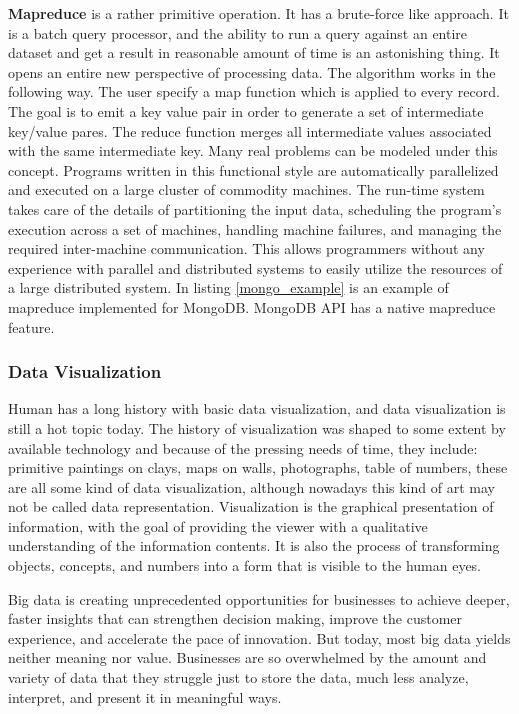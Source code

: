 \textbf{Mapreduce} is a rather primitive operation. It has a brute-force like approach. It is a batch query processor, and the ability to run a query against an entire dataset and get a result in reasonable amount of time is an astonishing thing. It opens an entire new perspective of processing data. The algorithm works in the following way. The user specify a map function which is applied to every record. The goal is to emit a key value pair in order to generate a set of intermediate key/value pares. The reduce function merges all intermediate values associated with the same intermediate key. Many real problems can be modeled under this concept. Programs written in this functional style are automatically parallelized and executed on a large cluster of commodity machines. The run-time system takes care of the details of partitioning the input data, scheduling the program's execution across a set of machines, handling machine failures, and managing the required inter-machine communication. This allows programmers without any experience with parallel and distributed systems to easily utilize the resources of a large distributed system. In listing \mbox{\ref{mongo_example}} is an example of mapreduce implemented for MongoDB. MongoDB API has a native mapreduce feature.



\subsubsection{Data Visualization}
Human has a long history with basic data visualization, and data visualization is still a hot topic today. The history of visualization was shaped to some extent by available technology and because of the pressing needs of time, they include: primitive paintings on clays, maps on walls, photographs, table of numbers, these are all some kind of data visualization, although nowadays this kind of art may not be called data representation. Visualization is the graphical presentation of information, with the goal of providing the viewer with a qualitative understanding of the information contents. It is also the process of transforming objects, concepts, and numbers into a form that is visible to the human eyes.

Big data is creating unprecedented opportunities for businesses to achieve deeper, faster insights that can strengthen decision making, improve the customer experience, and accelerate the pace of innovation. But today, most big data yields neither meaning nor value. Businesses are so overwhelmed by the amount and variety of data that they struggle just to store the data, much less analyze, interpret, and present it in meaningful ways.

